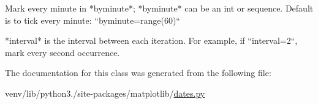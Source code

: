 \begin{DoxyVerb}Mark every minute in *byminute*; *byminute* can be an int or
sequence.  Default is to tick every minute: ``byminute=range(60)``

*interval* is the interval between each iteration.  For
example, if ``interval=2``, mark every second occurrence.
\end{DoxyVerb}
 

The documentation for this class was generated from the following file\+:\begin{DoxyCompactItemize}
\item 
venv/lib/python3./site-\/packages/matplotlib/\hyperlink{dates_8py}{dates.\+py}\end{DoxyCompactItemize}
